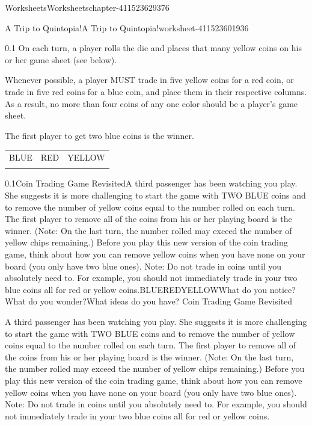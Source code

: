 \documentclass[twoside,11pt,]{book}
\begin{document}
\begin{chapterptx}{Worksheets}{}{Worksheets}{}{}{chapter-411523629376}
\begin{worksheet-section-numberless}{A Trip to Quintopia!}{}{A Trip to Quintopia!}{}{}{worksheet-411523601936}
\begin{divisionexercise}{1}{}{0.1}
On each turn, a player rolls the die and places that many yellow coins on his or her game sheet (see below).%
\par
\hypertarget{p-411523568208}{}%
Whenever possible, a player MUST trade in five yellow coins for a red coin, or trade in five red coins for a blue coin, and place them in their respective columns.  As a result, no more than four coins of any one color should be a player’s game sheet.%
\par
\hypertarget{p-411523567568}{}%
The first player to get two blue coins is the winner.%
\begin{table}
\centering
\begin{tabular}{lll}
BLUE&RED&YELLOW\tabularnewline[0pt]
&&
\end{tabular}
\end{table}
\end{divisionexercise}%
\clearpage
\begin{divisionexercise}{2}{}{0.1}{Coin Trading Game RevisitedA third passenger has been watching you play.  She suggests it is more challenging to start the game with TWO BLUE coins and to remove the number of yellow coins equal to the number rolled on each turn.  The first player to remove all of the coins from his or her playing board is the winner.  (Note: On the last turn, the number rolled may exceed the number of yellow chips remaining.)  Before you play this new version of the coin trading game, think about how you can remove yellow coins when you have none on your board (you only have two blue ones).  Note: Do not trade in coins until you absolutely need to.  For example, you should not immediately trade in your two blue coins all for red or yellow coins.BLUEREDYELLOWWhat do you notice?What do you wonder?What ideas do you have?}%
\hypertarget{p-411523560176}{}%
Coin Trading Game Revisited%
\par
\hypertarget{p-411523559776}{}%
A third passenger has been watching you play.  She suggests it is more challenging to start the game with TWO BLUE coins and to remove the number of yellow coins equal to the number rolled on each turn.  The first player to remove all of the coins from his or her playing board is the winner.  (Note: On the last turn, the number rolled may exceed the number of yellow chips remaining.)  Before you play this new version of the coin trading game, think about how you can remove yellow coins when you have none on your board (you only have two blue ones).  Note: Do not trade in coins until you absolutely need to.  For example, you should not immediately trade in your two blue coins all for red or yellow coins.%

\end{divisionexercise}
\end{worksheet-section-numberless}
\end{chapterptx}
\end{document}
